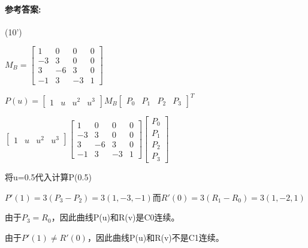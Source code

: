 \documentclass[12pt,a4paper,UTF8]{ctexart}
\begin{document}
	\paragraph{参考答案:}(10')
	\par $M_{B}=\begin{bmatrix}
	1&0&0&0\\
	-3&3&0&0\\
	3&-6&3&0\\
	-1&3&-3&1
	\end{bmatrix}$
	\par $P(u)=\begin{bmatrix}
		1&u&u^{2}&u^{3}
	\end{bmatrix}M_{B}\begin{bmatrix}
	P_{0}&P_{1}&P_{2}&P_{3}
	\end{bmatrix}^{T}$
	\par $\begin{bmatrix}
	1&u&u^{2}&u^{3}
	\end{bmatrix}\begin{bmatrix}
	1&0&0&0\\
	-3&3&0&0\\
	3&-6&3&0\\
	-1&3&-3&1
	\end{bmatrix}\begin{bmatrix}
	P_{0}\\
	P_{1}\\
	P_{2}\\
	P_{3}
	\end{bmatrix}$
	\par 将u=0.5代入计算P(0.5)
	\par $P'(1)=3(P_{3}-P_{2})=3(1,-3,-1)$而$R'(0)=3(R_{1}-R_{0})=3(1,-2,1)$
	\par 由于$P_{3}=R_{0}$，因此曲线P(u)和R(v)是C0连续。
	\par 由于$P'(1)\neq R'(0)$，因此曲线P(u)和R(v)不是C1连续。
\end{document}
